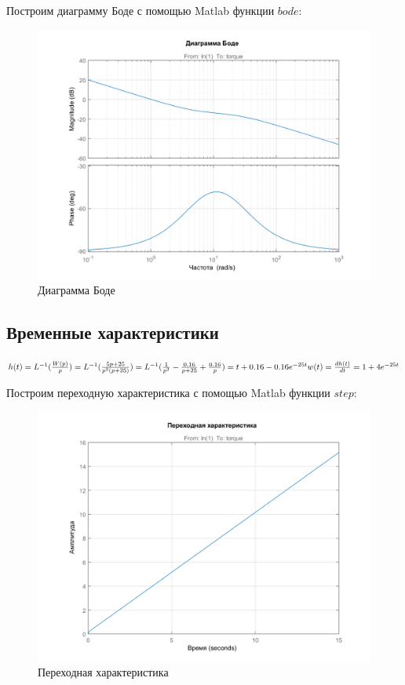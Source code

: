 \documentclass[14pt,a4paper,report]{report}
\begin{document}
Построим диаграмму Боде с помощью Matlab функции $bode$:

\begin{figure}[h!]
	\centering
	\includegraphics[scale = 0.70]{images/bode.png}
	\caption{Диаграмма Боде}
	\label{image:4}
\end{figure}

\subsection{Временные характеристики}

$
\\
h(t)=L^{-1}(\frac{W(p)}{p})=L^{-1}(\frac{5p+25}{p^2(p+25)})=L^{-1}(\frac{1}{p^2}-\frac{0.16}{p+25}+\frac{0.16}{p})=t+0.16-0.16e^{-25t}\\
w(t)=\frac{dh(t)}{dt}=1+4e^{-25t}\\
$

Построим переходную характеристика с помощью Matlab функции $step$:

\begin{figure}[h!]
	\centering
	\includegraphics[scale = 0.60]{images/step.png}
	\caption{Переходная характеристика}
	\label{image:5}
\end{figure}
\end{document}
